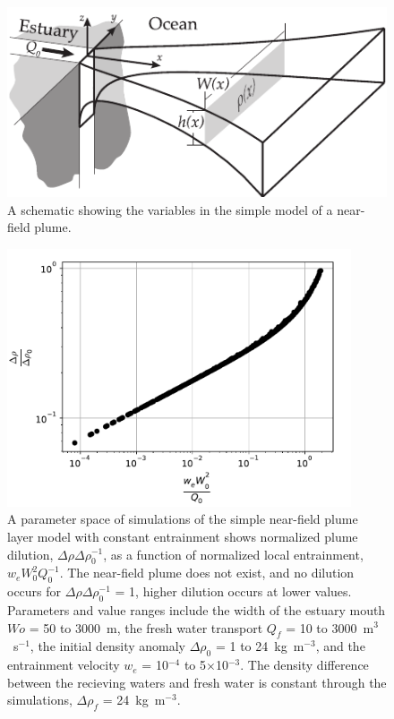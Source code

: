 \documentclass[12pt]{article}
\begin{document}
{


\clearpage
\listoffigures

\begin{figure}[p]
    \centering
    \includegraphics[width=5in]{Figures/plume_vars_flat.pdf}
    \caption{A schematic showing the variables in the simple model of a near-field plume.}
    \label{fig:plume_vars}
\end{figure}

\begin{figure}[p]
    \centering
    \includegraphics[width=4in]{Figures/plume_dilution.pdf}
    \caption{A parameter space of simulations of the simple near-field plume layer model with constant entrainment shows normalized plume dilution, $\Delta\rho \Delta\rho_0^{-1}$, as a function of normalized local entrainment, $w_e W_0^2 Q_0^{-1}$. The near-field plume does not exist, and no dilution occurs for $\Delta\rho \Delta\rho_0^{-1}$ = 1, higher dilution occurs at lower values. Parameters and value ranges include the width of the estuary mouth $Wo$ = 50 to 3000~m, the fresh water transport $Q_f$ = 10 to 3000~m$^3$~s$^{-1}$, the initial density anomaly $\Delta\rho_0$ = 1 to 24~kg~m$^{-3}$, and the entrainment velocity $w_e$ = 10$^{-4}$ to 5$\times$10$^{-3}$. The density difference between the recieving waters and fresh water is constant through the simulations, $\Delta\rho_f$ = 24~kg~m$^{-3}$.}
    \label{fig:dilution}
\end{figure}

}
\end{document}
